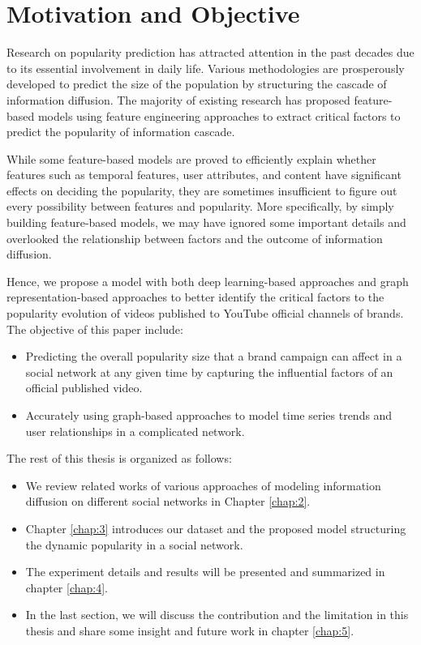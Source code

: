 \section{Motivation and Objective}

Research on popularity prediction has attracted attention in the past decades due to its essential involvement in daily life. Various methodologies are prosperously developed to predict the size of the population by structuring the cascade of information diffusion. The majority of existing research has proposed feature-based models using feature engineering approaches to extract critical factors to predict the popularity of information cascade. 

While some feature-based models are proved to efficiently explain whether features such as temporal features, user attributes, and content have significant effects on deciding the popularity, they are sometimes insufficient to figure out every possibility between features and popularity. More specifically, by simply building feature-based models, we may have ignored some important details and overlooked the relationship between factors and the outcome of information diffusion. 

Hence, we propose a model with both deep learning-based approaches and graph representation-based approaches to better identify the critical factors to the popularity evolution of videos published to YouTube official channels of brands. The objective of this paper include:

\begin{itemize}
\setlength{\itemsep}{0pt}
\setlength{\parskip}{0pt}
\setlength{\topsep}{0pt}
\setlength{\partopsep}{0pt}
    \item Predicting the overall popularity size that a brand campaign can affect in a social network at any given time by capturing the influential factors of an official published video.
    \item Accurately using graph-based approaches to model time series trends and user relationships in a complicated network.
\end{itemize}

The rest of this thesis is organized as follows:

\begin{itemize}
\setlength{\itemsep}{0pt}
\setlength{\parskip}{0pt}
\setlength{\topsep}{0pt}
\setlength{\partopsep}{0pt}
    \item We review related works of various approaches of modeling information diffusion on different social networks in Chapter \ref{chap:2}.
    \item Chapter \ref{chap:3} introduces our dataset and the proposed model structuring the dynamic popularity in a social network.
    \item The experiment details and results will be presented and summarized in chapter \ref{chap:4}.
    \item In the last section, we will discuss the contribution and the limitation in this thesis and share some insight and future work in chapter \ref{chap:5}.
\end{itemize}
